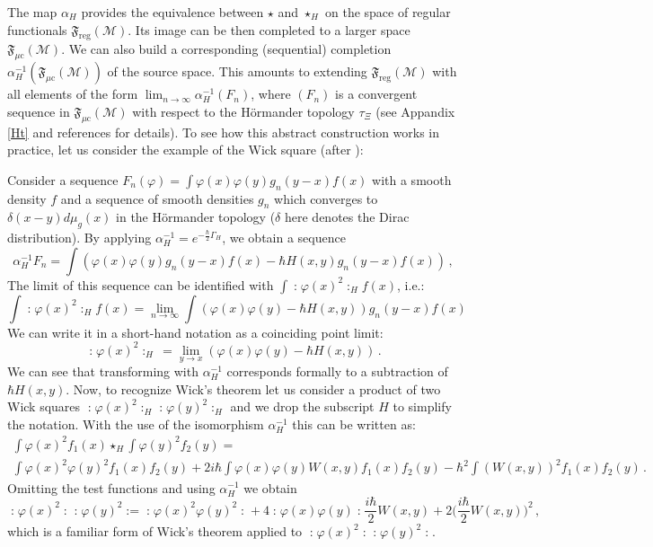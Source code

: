 \documentclass[11pt]{article}
\newcommand{\F}{\mathfrak{F}}
\newcommand{\Mcal}{\mathcal{M}}
\newcommand{\reg}{\mathrm{reg}}
\newcommand{\mc}{{\mu\mathrm{c}}}
\newcommand{\al}{\alpha}
\newcommand{\ph}{\varphi}
\newcommand{\1}{\mathds{1}}                         %
\begin{document}
{{The map $\al_H$ provides the equivalence between $\star$ and $\star_H$ on the space of regular functionals $\F_\reg(\Mcal)$. Its image can be then completed to a larger space $\F_\mc(\Mcal)$. We can also build a corresponding (sequential) completion $\al_H^{-1}(\F_\mc(\Mcal))$ of the source space. This amounts to extending  $\F_\reg(\Mcal)$ with all elements of the form $\lim_{n\rightarrow \infty}\al_H^{-1}(F_n)$, where $(F_n)$ is a convergent sequence in $\F_\mc(\Mcal)$ with respect to the H\"ormander topology $\tau_\Xi$ (see Appandix \ref{Ht} and references \cite{BDF,BaerF,Hoer1} for details). To see how this abstract construction works in practice, let us consider the example of the Wick square (after \cite{FR12}):
 \begin{exa}\label{Wick}
Consider a sequence $F_n(\ph)=\int \ph(x)\ph(y)g_n(y-x)f(x)$ with a smooth density $f$ and a sequence of smooth densities $g_n$ which converges to $\delta(x-y) d\mu_g(x)$ in the H\"ormander topology ($\delta$ here denotes the Dirac distribution). By applying $\al_H^{-1}=e^{-\tfrac{\hbar}{2}\Gamma_H}$, we obtain a sequence 
\[
\al_H^{-1}F_n= \int (\ph(x)\ph(y)g_n(y-x)f(x)-\hbar H(x,y)g_n(y-x)f(x))\,,
\]
The limit of this sequence can be identified with $\int \mathopen:\ph(x)^2\mathclose:_Hf(x)$, i.e.:
\[
\int \mathopen:\ph(x)^2\mathclose:_Hf(x)=\lim_{n\rightarrow\infty}\int (\ph(x)\ph(y)-\hbar H(x,y))g_n(y-x)f(x)
\]
We can write it in a short-hand notation as a coinciding point limit:
\[
\mathopen:\ph(x)^2\mathclose:_H\,=\lim_{y\rightarrow x}(\ph(x)\ph(y)-\hbar H(x,y))\,.
\]
 We can see that transforming with $\al_H^{-1}$ corresponds formally to a subtraction of $\hbar H(x,y)$.
Now, to recognize Wick's theorem let us consider a product of two Wick squares $ \mathopen:\ph(x)^2\mathclose:_H \mathopen:\ph(y)^2\mathclose:_H$  and we drop the subscript $H$ to simplify the notation. With the use of the isomorphism $\al_H^{-1}$ this can be written as:
\begin{multline*}
\int \ph(x)^2 f_1(x)\star_H\int \ph(y)^2 f_2(y)=\\
\int \ph(x)^2 \ph(y)^2f_1(x) f_2(y)+2i\hbar \int \ph(x) \ph(y)W(x,y)f_1(x) f_2(y)-\hbar^2\int (W(x,y))^2f_1(x) f_2(y)\,.
\end{multline*}
Omitting the test functions and using $\al_H^{-1}$ we obtain
\[
\mathopen:\ph(x)^2\mathclose:\mathopen:\ph(y)^2\mathclose:=\mathopen:\ph(x)^2 \ph(y)^2\mathclose:+4 \mathopen:\ph(x) \ph(y)\mathclose:\frac{i\hbar}{2}W(x,y)+2\Big(\frac{i\hbar}{2}W(x,y)\Big)^2\,,
\]
which is a familiar form of Wick's theorem applied to $\mathopen:\ph(x)^2\mathclose:\mathopen:\ph(y)^2\mathclose:$.

\end{exa}}}
\end{document}
